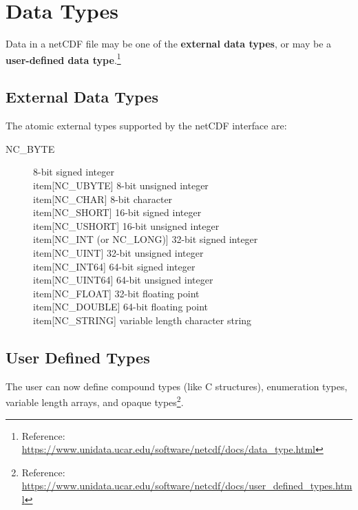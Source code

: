 \section{Data Types}

\tab
Data in a netCDF file may be one of the \textbf{external data types}, or may be a \textbf{user-defined data type}.\footnote{Reference: \url{https://www.unidata.ucar.edu/software/netcdf/docs/data_type.html}}

\subsection{External Data Types}

\tab
The atomic external types supported by the netCDF interface are:

\begin{description}

\item[\small NC\_BYTE] 8-bit signed integer
\\item[\small NC\_UBYTE] 8-bit unsigned integer
\\item[\small NC\_CHAR] 8-bit character
\\item[\small NC\_SHORT] 16-bit signed integer
\\item[\small NC\_USHORT] 16-bit unsigned integer
\\item[\small NC\_INT (or NC\_LONG)] 32-bit signed integer
\\item[\small NC\_UINT] 32-bit unsigned integer
\\item[\small NC\_INT64] 64-bit signed integer
\\item[\small NC\_UINT64] 64-bit unsigned integer
\\item[\small NC\_FLOAT] 32-bit floating point
\\item[\small NC\_DOUBLE] 64-bit floating point
\\item[\small NC\_STRING] variable length character string

\end{description}

\subsection{User Defined Types}

\tab
The user can now define compound types (like C structures), enumeration types, variable length arrays, and opaque types\footnote{Reference: \url{https://www.unidata.ucar.edu/software/netcdf/docs/user\_defined\_types.html}}.

